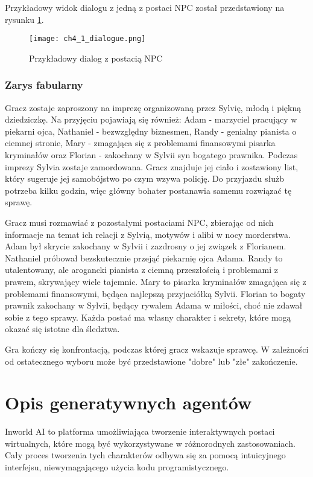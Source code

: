 Przykładowy widok dialogu z jedną z postaci NPC został przedstawiony na rysunku \ref{fig:ch4_1_dialogue}.

\begin{figure}[h!]
    \centering
    \texttt{[image: ch4\_1\_dialogue.png]}
    \caption{Przykładowy dialog z postacią NPC}
    \label{fig:ch4_1_dialogue}
\end{figure}

\subsubsection*{Zarys fabularny}

Gracz zostaje zaproszony na imprezę organizowaną przez Sylvię, młodą i piękną dziedziczkę. Na
przyjęciu pojawiają się również: Adam - marzyciel pracujący w piekarni ojca, Nathaniel -
bezwzględny biznesmen, Randy - genialny pianista o ciemnej stronie, Mary - zmagająca się z
problemami finansowymi pisarka kryminałów oraz Florian - zakochany w Sylvii syn bogatego prawnika.
Podczas imprezy Sylvia zostaje zamordowana. Gracz znajduje jej ciało i zostawiony list, który
sugeruje jej samobójstwo po czym wzywa policję. Do przyjazdu służb potrzeba kilku godzin, więc
główny bohater postanawia samemu rozwiązać tę sprawę.

Gracz musi rozmawiać z pozostałymi postaciami NPC, zbierając od nich informacje na temat ich
relacji z Sylvią, motywów i alibi w nocy morderstwa. Adam był skrycie zakochany w Sylvii i
zazdrosny o jej związek z Florianem. Nathaniel próbował bezskutecznie przejąć piekarnię ojca Adama.
Randy to utalentowany, ale arogancki pianista z ciemną przeszłością i problemami z prawem,
skrywający wiele tajemnic. Mary to pisarka kryminałów zmagająca się z problemami finansowymi,
będąca najlepszą przyjaciółką Sylvii. Florian to bogaty prawnik zakochany w Sylvii, będący rywalem
Adama w miłości, choć nie zdawał sobie z tego sprawy. Każda postać ma własny charakter i sekrety,
które mogą okazać się istotne dla śledztwa.

Gra kończy się konfrontacją, podczas której gracz wskazuje sprawcę.
W zależności od ostatecznego wyboru może być przedstawione "dobre" lub "złe" zakończenie.

\section{Opis generatywnych agentów}\label{section:ch4_2}

Inworld AI to platforma umożliwiająca tworzenie interaktywnych postaci wirtualnych, które mogą być
wykorzystywane w różnorodnych zastosowaniach. Cały proces tworzenia tych charakterów odbywa się za
pomocą intuicyjnego interfejsu, niewymagającego użycia kodu programistycznego.

